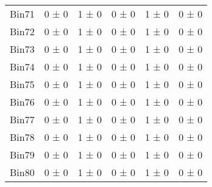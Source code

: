 \begin{tabular}{@{\extracolsep{4pt}}lccccc@{}}
     Bin71 & 0 ± 0 & 1 ± 0 & 0 ± 0 & 1 ± 0 & 0 ± 0 \\ 
     Bin72 & 0 ± 0 & 1 ± 0 & 0 ± 0 & 1 ± 0 & 0 ± 0 \\ 
     Bin73 & 0 ± 0 & 1 ± 0 & 0 ± 0 & 1 ± 0 & 0 ± 0 \\ 
     Bin74 & 0 ± 0 & 1 ± 0 & 0 ± 0 & 1 ± 0 & 0 ± 0 \\ 
     Bin75 & 0 ± 0 & 1 ± 0 & 0 ± 0 & 1 ± 0 & 0 ± 0 \\ 
     Bin76 & 0 ± 0 & 1 ± 0 & 0 ± 0 & 1 ± 0 & 0 ± 0 \\ 
     Bin77 & 0 ± 0 & 1 ± 0 & 0 ± 0 & 1 ± 0 & 0 ± 0 \\ 
     Bin78 & 0 ± 0 & 1 ± 0 & 0 ± 0 & 1 ± 0 & 0 ± 0 \\ 
     Bin79 & 0 ± 0 & 1 ± 0 & 0 ± 0 & 1 ± 0 & 0 ± 0 \\ 
     Bin80 & 0 ± 0 & 1 ± 0 & 0 ± 0 & 1 ± 0 & 0 ± 0 \\ 
\hline\hline
  \end{tabular}
